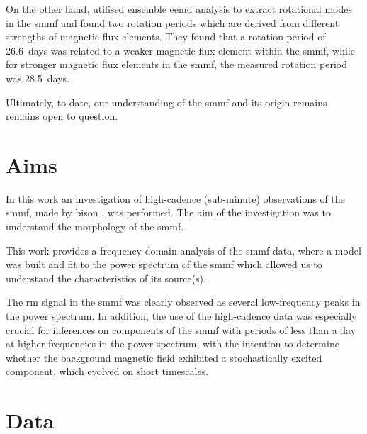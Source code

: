 On the other hand, \citet{xiang_ensemble_2016} utilised ensemble \gls{eemd} analysis to extract rotational modes in the \gls{smmf} and found two rotation periods which are derived from different strengths of magnetic flux elements. They found that a rotation period of 26.6~days was related to a weaker magnetic flux element within the \gls{smmf}, while for stronger magnetic flux elements in the \gls{smmf}, the measured rotation period was 28.5~days.

Ultimately, to date, our understanding of the \gls{smmf} and its origin remains remains open to question.


\section{Aims}\label{sec:SMMF_aims}

In this work an investigation of high-cadence (sub-minute) observations of the \gls{smmf}, made by \gls{bison} \citep{chaplin_bison_1996, chaplin_noise_2005, hale_performance_2016}, was performed. The aim of the investigation was to understand the morphology of the \gls{smmf}. 

This work provides a frequency domain analysis of the \gls{smmf} data, where a model was built and fit to the power spectrum of the \gls{smmf} which allowed us to understand the characteristics of its source(s). 

The \gls{rm} signal in the \gls{smmf} was clearly observed as several low-frequency peaks in the power spectrum. In addition, the use of the high-cadence data was especially crucial for inferences on components of the \gls{smmf} with periods of less than a day at higher frequencies in the power spectrum, with the intention to determine whether the background magnetic field exhibited a stochastically excited component, which evolved on short timescales.




\section{Data}\label{sec:SMMF_data}


